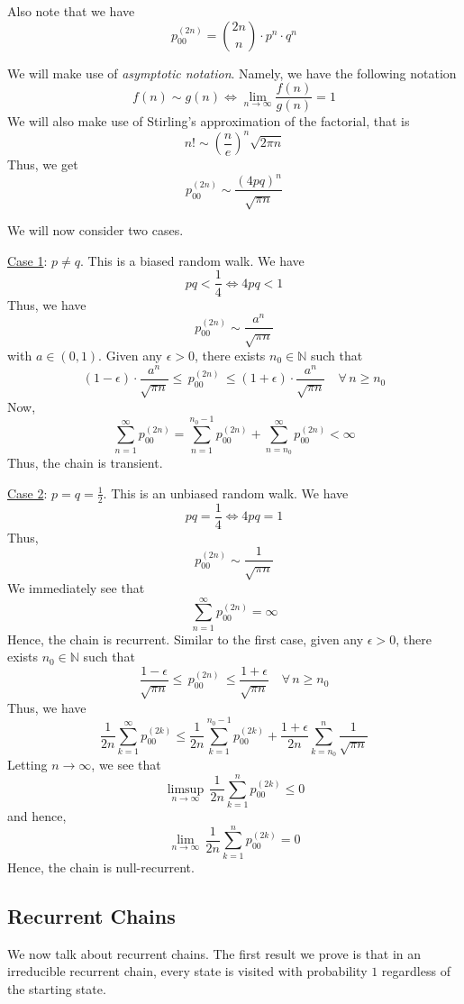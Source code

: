 \documentclass[12pt]{article}
\theoremstyle{definition}
\begin{document}
Also note that we have
\[
    p_{00}^{(2n)} = \binom{2n}{n} \cdot p^n \cdot q^n
\]

We will make use of \emph{asymptotic notation}. Namely, we have the following notation
\[
    f(n) \sim g(n) \iff \lim_{n \to \infty} \frac{f(n)}{g(n)} = 1
\]
We will also make use of Stirling's approximation of the factorial, that is
\[
    n! \sim \left( \frac{n}{e} \right)^n \sqrt{2\pi n}
\]
Thus, we get
\[
    p_{00}^{(2n)} \sim \frac{\left( 4pq \right)^n}{\sqrt{\pi n}}
\]

We will now consider two cases. 

\medskip

\underline{Case 1}: $p \neq q$. This is a biased random walk. We have
\[
    pq < \frac{1}{4} \iff 4pq < 1
\]
Thus, we have
\[
    p_{00}^{(2n)} \sim \frac{a^n}{\sqrt{\pi n}} 
\]
with $a \in (0,1)$. Given any $\epsilon > 0$, there exists $n_0 \in \mathbb{N}$ such that
\[
    (1- \epsilon) \cdot \frac{a^n}{\sqrt{\pi n}} \leq \, p_{00}^{(2n)} \, \leq (1+\epsilon) \cdot \frac{a^n}{\sqrt{\pi n}} \quad \forall \, n \geq n_0
\]
Now, 
\[
    \sum_{n=1}^{\infty} p_{00}^{(2n)} = \sum_{n=1}^{n_0 - 1} p_{00}^{(2n)} + \sum_{n=n_0}^{\infty} p_{00}^{(2n)} < \infty
\]
Thus, the chain is transient.

\medskip

\underline{Case 2}: $p = q = \frac{1}{2}$. This is an unbiased random walk. We have
\[
    pq = \frac{1}{4} \iff 4pq = 1
\]
Thus, 
\[
    p_{00}^{(2n)} \sim \frac{1}{\sqrt{\pi n}}
\]
We immediately see that 
\[
    \sum_{n=1}^{\infty} p_{00}^{(2n)} = \infty
\]
Hence, the chain is recurrent. Similar to the first case, given any $\epsilon > 0$, there exists $n_0 \in \mathbb{N}$ such that
\[
    \frac{1-\epsilon}{\sqrt{\pi n}} \leq \, p_{00}^{(2n)} \, \leq \frac{1+\epsilon}{\sqrt{\pi n}} \quad \forall \, n \geq n_0
\]
Thus, we have
\[
    \frac{1}{2n} \sum_{k=1}^{\infty} p_{00}^{(2k)} \leq \frac{1}{2n} \sum_{k=1}^{n_0-1} p_{00}^{(2k)} + \frac{1+\epsilon}{2n} \sum_{k=n_0}^{n} \frac{1}{\sqrt{\pi n}}
\]
Letting $n \to \infty$, we see that
\[
    \limsup_{n \to \infty} \, \frac{1}{2n} \sum_{k=1}^{n} p_{00}^{(2k)} \leq 0 
\]
and hence,
\[
    \lim_{n \to \infty} \, \frac{1}{2n} \sum_{k=1}^n p_{00}^{(2k)} = 0
\]
Hence, the chain is null-recurrent.

\subsection{Recurrent Chains}

We now talk about recurrent chains. The first result we prove is that in an irreducible recurrent chain, every state is visited with probability $1$ regardless of the starting state.
\end{document}
